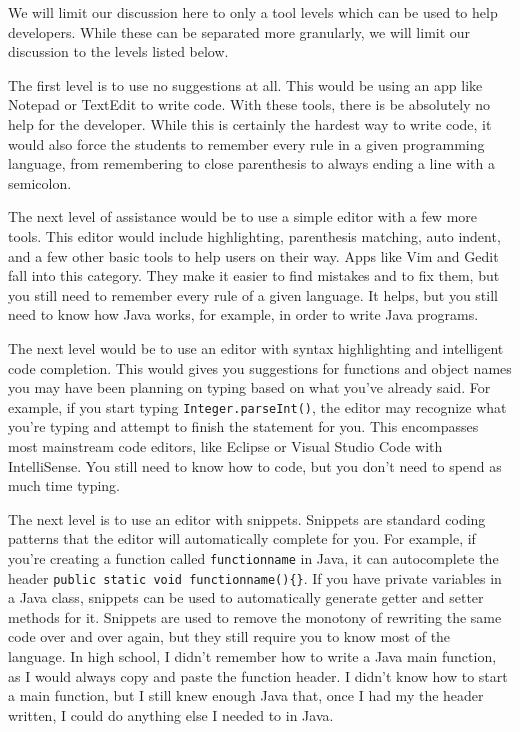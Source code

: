 \documentclass[12pt]{article}
\begin{document}
We will limit our discussion here to only a tool levels which can be
used to help developers. While these can be separated more granularly,
we will limit our discussion to the levels listed below.

The first level is to use no suggestions at all. This would be using an
app like Notepad or TextEdit to write code. With these tools, there is
be absolutely no help for the developer. While this is certainly the
hardest way to write code, it would also force the students to remember
every rule in a given programming language, from remembering to close
parenthesis to always ending a line with a semicolon.

The next level of assistance would be to use a simple editor with a few
more tools. This editor would include highlighting, parenthesis
matching, auto indent, and a few other basic tools to help users on
their way. Apps like Vim and Gedit fall into this category. They make it
easier to find mistakes and to fix them, but you still need to remember
every rule of a given language. It helps, but you still need to know how
Java works, for example, in order to write Java programs.

The next level would be to use an editor with syntax highlighting and
intelligent code completion. This would gives you suggestions for
functions and object names you may have been planning on typing based on
what you've already said. For example, if you start typing
\texttt{Integer.parseInt()}, the editor may recognize what you're typing
and attempt to finish the statement for you. This encompasses most
mainstream code editors, like Eclipse or Visual Studio Code with
IntelliSense. You still need to know how to code, but you don't need to
spend as much time typing.

The next level is to use an editor with snippets. Snippets are standard
coding patterns that the editor will automatically complete for you. For
example, if you're creating a function called \texttt{functionname} in
Java, it can autocomplete the header
\texttt{public\ static\ void\ functionname()\{\}}. If you have private
variables in a Java class, snippets can be used to automatically
generate getter and setter methods for it. Snippets are used to remove
the monotony of rewriting the same code over and over again, but they
still require you to know most of the language. In high school, I didn't
remember how to write a Java main function, as I would always copy and
paste the function header. I didn't know how to start a main function,
but I still knew enough Java that, once I had my the header written, I
could do anything else I needed to in Java.
\end{document}
